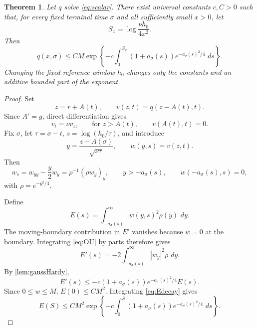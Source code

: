 \documentclass[11pt]{article}
\numberwithin{equation}{section}
\newtheorem{theorem}{Theorem}[section]
\theoremstyle{definition}
\newcommand{\dd}{\,d}
\begin{document}
\begin{theorem}\label{thm:scalar-general}
Let $q$ solve \eqref{eq:scalar}.  There exist universal constants $c,C>0$ such that, for every fixed terminal time $\sigma$ and all sufficiently small $x>0$, let
\[
 S_x=\log\frac{\nu h_0}{4x^2}.
\]
Then
\begin{equation}\label{eq:scalar-general-est}
 q(x,\sigma)
 \le CM\exp\left
 \{-c\int_{0}^{S_x}
 (1+a_\sigma(s))e^{-a_\sigma(s)^2/4}\,\dd s\right
 \}.
\end{equation}
Changing the fixed reference window $h_0$ changes only the constants and an additive bounded part of the exponent.
\end{theorem}

\begin{proof}
Set
\[
 z=r+A(t),
 \qquad
 v(z,t)=q(z-A(t),t).
\]
Since $A'=g$, direct differentiation gives
\[
 v_t=\nu v_{zz}
 \qquad\text{for }z>A(t),
 \qquad
 v(A(t),t)=0.
\]
Fix $\sigma$, let $\tau=\sigma-t$, $s=\log(h_0/\tau)$, and introduce
\[
 y=\frac{z-A(\sigma)}{\sqrt{\nu\tau}},
 \qquad
 w(y,s)=v(z,t).
\]
Then
\begin{equation}\label{eq:OU}
 w_s=w_{yy}-\frac y2w_y
 =\rho^{-1}(\rho w_y)_y,
 \qquad
 y>-a_\sigma(s),
 \qquad
 w(-a_\sigma(s),s)=0,
\end{equation}
with $\rho=e^{-y^2/4}$.

Define
\[
 E(s)=\int_{-a_\sigma(s)}^\infty w(y,s)^2\rho(y)\,\dd y.
\]
The moving-boundary contribution in $E'$ vanishes because $w=0$ at the boundary.  Integrating \eqref{eq:OU} by parts therefore gives
\[
 E'(s)=-2\int_{-a_\sigma(s)}^\infty |w_y|^2\rho\,\dd y.
\]
By \cref{lem:gaussHardy},
\begin{equation}\label{eq:Edecay}
 E'(s)
 \le-c(1+a_\sigma(s))e^{-a_\sigma(s)^2/4}E(s).
\end{equation}
Since $0\le w\le M$, $E(0)\le CM^2$.  Integrating \eqref{eq:Edecay} gives
\begin{equation}\label{eq:Eint}
 E(S)\le CM^2\exp\left\{-c\int_{0}^{S}
 (1+a_\sigma(s))e^{-a_\sigma(s)^2/4}\,\dd s\right\}.
\end{equation}


\end{proof}
\end{document}
